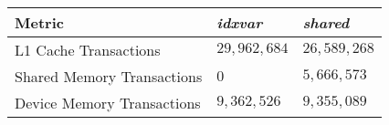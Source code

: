 \begin{table}
    \begin{tabular}{l l l}
        \hline
        \textbf{Metric} & \textbf{\emph{idxvar}} & \textbf{\emph{shared}} \\
        \hline
        \hline
        L1 Cache Transactions & $29,962,684$ & $26,589,268$ \\
        Shared Memory Transactions & $0$ & $5,666,573$ \\
        Device Memory Transactions & $9,362,526$ & $9,355,089$ \\

\end{tabular}
\end{table}
